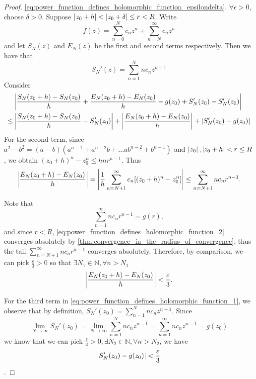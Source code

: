 \documentclass[notoc,notitlepage]{tufte-book}
\begin{document}
\begin{proof}
	\WTP \eqref{eq:power_function_defines_holomorphic_function_epsilondelta}. $\forall \epsilon > 0$, choose $\delta > 0$. Suppose $\left|z_0 + h\right| < \left|z_0 + \delta\right| \leq r < R$. Write
	\begin{equation*}
		f(z) = \sum_{n=0}^{N} c_n z^n + \sum_{n=N}^{\infty} c_n z^n
	\end{equation*}
	and let $S_N(z)$ and $E_N(z)$ be the first and second terms respectively.
	Then we have that
	\begin{equation*}
		S_N'(z) = \sum_{n=1}^{N} nc_n z^{n - 1}
	\end{equation*}
	Consider
	\begin{align}
			&\left|\frac{S_N(z_0 + h) - S_N(z_0)}{h} + \frac{E_N(z_0 + h) - E_N(z_0)}{h} - g(z_0) + S_N'(z_0) - S_N'(z_0)\right| \nonumber \\
		\leq &\left|\frac{S_N(z_0 + h) - S_N(z_0)}{h} - S_N'(z_0)\right| + \left|\frac{E_N(z_0 + h) - E_N(z_0)}{h}\right| + \left|S_N'(z_0) - g(z_0)\right| \label{eq:power_function_defines_holomorphic_function_1}
	\end{align}
	For the second term, since $a^2 - b^2 = (a - b)(a^{n - 1} + a^{n - 2}b + \hdots ab^{n - 2} + b^{n - 1})$ and $\left|z_0\right|, \left|z_0 + h\right| < r \leq R$, we obtain $(z_0 + h)^n - z_0^n \leq hnr^{n - 1}$. Thus
	\begin{equation*}
		\left|\frac{E_N(z_0 + h) - E_N(z_0)}{h}\right| = \left|\frac{1}{h} \sum_{n=N+1}^{\infty} c_n [(z_0 + h)^n - z_0^n]\right| \leq \sum_{n=N+1}^{\infty} nc_nr^{n-1}.
	\end{equation*}

	Note that
	\begin{equation}\label{eq:power_function_defines_holomorphic_function_2}
		\sum_{n=1}^{\infty} nc_nr^{n-1} = g(r),
	\end{equation}
	and since $r < R$, \cref{eq:power_function_defines_holomorphic_function_2} converges absolutely by \cref{thm:convergence_in_the_radius_of_convergence}, thus the tail
	$\sum_{n=N+1}^{\infty} nc_n r^{n - 1}$ converges absolutely. Therefore, by comparison, we can pick $\frac{\epsilon}{3} > 0$ so that $\exists N_1 \in \mathbb{N}, \forall n > N_1$
	\begin{equation*}
		\left|\frac{E_N(z_0 + h) - E_N(z_0)}{h}\right| < \frac{\varepsilon}{3}.
	\end{equation*}
	
	For the third term in \cref{eq:power_function_defines_holomorphic_function_1}, we observe that by definition, $S_N'(z_0) = \sum_{n=1}^{N} nc_n z^{n - 1}$. Since
	\begin{equation*}
		\lim_{N \to \infty} S_N'(z_0) = \lim_{N \to \infty} \sum_{n=1}^{N} nc_n z^{n - 1} = \sum_{n=1}^{\infty} nc_n z^{n - 1} = g(z_0)
	\end{equation*}
	we know that we can pick $\frac{\epsilon}{3} > 0, \exists N_2 \in \mathbb{N}, \forall n > N_2$, we have
	\begin{equation*}
		\left|S_N'(z_0) - g(z_0)\right| < \frac{\varepsilon}{3}
	\end{equation*}.


\end{proof}
\end{document}
